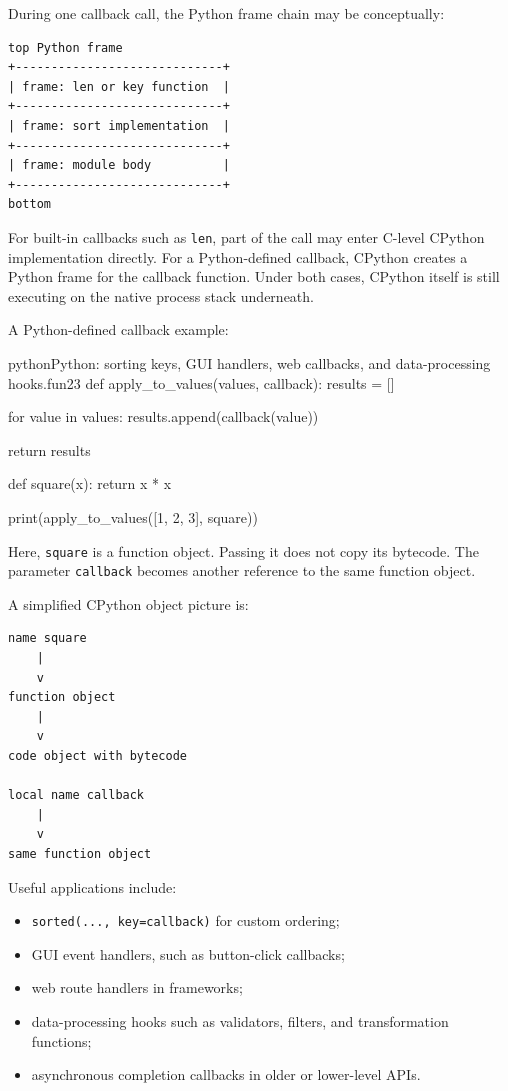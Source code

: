 During one callback call, the Python frame chain may be conceptually:

\begin{verbatim}
top Python frame
+-----------------------------+
| frame: len or key function  |
+-----------------------------+
| frame: sort implementation  |
+-----------------------------+
| frame: module body          |
+-----------------------------+
bottom
\end{verbatim}

For built-in callbacks such as \texttt{len}, part of the call may enter C-level CPython implementation directly. For a Python-defined callback, CPython creates a Python frame for the callback function. Under both cases, CPython itself is still executing on the native process stack underneath.

A Python-defined callback example:

\begin{codebox}[]{python}{Python: sorting keys, GUI handlers, web callbacks, and data-processing hooks.}{fun23}
def apply_to_values(values, callback):
    results = []

    for value in values:
        results.append(callback(value))

    return results


def square(x):
    return x * x


print(apply_to_values([1, 2, 3], square))
\end{codebox}


Here, \texttt{square} is a function object. Passing it does not copy its bytecode. The parameter \texttt{callback} becomes another reference to the same function object.

A simplified CPython object picture is:

\begin{verbatim}
name square
    |
    v
function object
    |
    v
code object with bytecode

local name callback
    |
    v
same function object
\end{verbatim}

Useful applications include:

\begin{itemize}
    \item \texttt{sorted(..., key=callback)} for custom ordering;
    \item GUI event handlers, such as button-click callbacks;
    \item web route handlers in frameworks;
    \item data-processing hooks such as validators, filters, and transformation functions;
    \item asynchronous completion callbacks in older or lower-level APIs.
\end{itemize}

